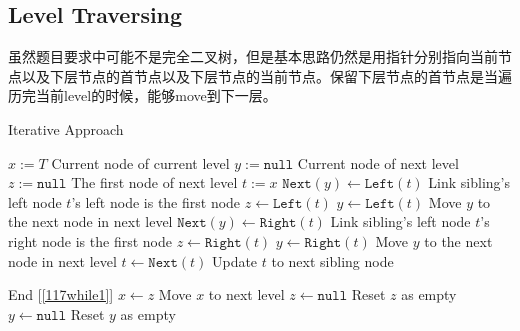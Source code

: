 \subsection{Level Traversing}
\begin{CJK*}{UTF8}{gbsn}
虽然题目要求中可能不是完全二叉树，但是基本思路仍然是用指针分别指向当前节点以及下层节点的首节点以及下层节点的当前节点。保留下层节点的首节点是当遍历完当前level的时候，能够move到下一层。
\end{CJK*}
\setcounter{algorithm}{0}
\begin{algorithm}[H]
\caption{Iterative Approach}
\begin{algorithmic}[1]
\State \Return
\EndIf
\State $x:=T$ \Comment Current node of current level
\State $y:=\texttt{null}$ \Comment Current node of next level
\State $z:=\texttt{null}$ \Comment The first node of next level
\State $t:=x$
 \label{117while1} 
\State $\texttt{Next}(y)\gets \texttt{Left}(t)$ \Comment Link sibling's left node
\Else \Comment $t$'s left node is the first node
\State $z\gets \texttt{Left}(t)$
\EndIf
\State $y\gets \texttt{Left}(t)$ \Comment Move $y$ to the next node in next level
\EndIf
{}
\State $\texttt{Next}(y)\gets \texttt{Right}(t)$ \Comment Link sibling's left node
\Else \Comment $t$'s right node is the first node
\State $z\gets \texttt{Right}(t)$
\EndIf
\State $y\gets \texttt{Right}(t)$ \Comment Move $y$ to the next node in next level
\EndIf
\State $t\gets \texttt{Next}(t)$ \Comment Update $t$ to next sibling node
\end{algorithmic}
\end{algorithm}
\begin{algorithm}[H]
\begin{algorithmic}[1]
\EndWhile \Comment End [\ref{117while1}]
\State $x\gets z$ \Comment Move $x$ to next level
\State $z\gets \texttt{null}$ \Comment Reset $z$ as empty
\State $y\gets \texttt{null}$ \Comment Reset $y$ as empty
\EndWhile
\EndProcedure
\end{algorithmic}
\end{algorithm}